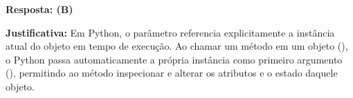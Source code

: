 \ifmostrarGabarito
\textbf{Resposta: (B)}

\textbf{Justificativa:}
Em Python, o parâmetro  referencia explicitamente a instância atual do objeto em tempo de execução. Ao chamar um método em um objeto (), o Python passa automaticamente a própria instância como primeiro argumento (), permitindo ao método inspecionar e alterar os atributos e o estado daquele objeto.

\fi
